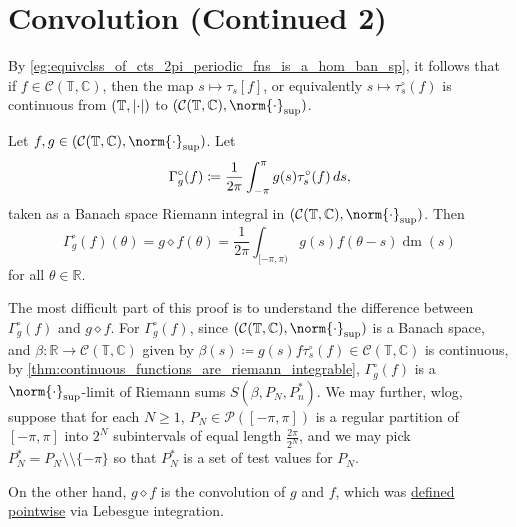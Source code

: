 \documentclass[notoc,notitlepage]{tufte-book}
\DeclareMathOperator{\dm}{dm}
\begin{document}
\section{Convolution (Continued 2)}%
\label{sec:convolution_continued_2}

By \cref{eg:equivclss_of_cts_2pi_periodic_fns_is_a_hom_ban_sp},
it follows that if $f \in \mathcal{C}(\mathbb{T}, \mathbb{C})$, then
the map $s \mapsto \tau_s[f]$, or equivalently $s \mapsto \tau_s^\circ(f)$
is continuous from $(\mathbb{T}, \left|\cdot\right|)$ to
$(\mathcal{C}(\mathbb{T}, \mathbb{C}), \norm{\cdot}_{\sup})$.

\begin{lemma}\label{lemma:pointwise_value_of_gamma_g}
  Let $f, g \in (\mathcal{C}(\mathbb{T}, \mathbb{C}), \norm{\cdot}_{\sup})$.
  Let
  \begin{equation*}
    \Gamma_g^\circ(f)
    \coloneqq \frac{1}{2\pi} \int_{-\pi}^{\pi} g(s)\tau_s^{\circ}(f) \mathop{}\!d{s},
  \end{equation*}
  taken as a Banach space Riemann integral
  in $(\mathcal{C}(\mathbb{T}, \mathbb{C}), \norm{\cdot}_{\sup})$.
  Then
  \begin{equation*}
    \Gamma_g^{\circ}(f)(\theta) = g \diamond f(\theta)
    = \frac{1}{2\pi} \int_{[-\pi, \pi)} g(s)f(\theta - s) \dm(s)
  \end{equation*}
  for all $\theta \in \mathbb{R}$.
\end{lemma}

\begin{strategy}
  The most difficult part of this proof is to understand the difference
  between $\Gamma_g^\circ(f)$ and $g \diamond f$.
  For $\Gamma_g^{\circ}(f)$,
  since $(\mathcal{C}(\mathbb{T}, \mathbb{C}), \norm{\cdot}_{\sup})$ is a Banach space,
  and $\beta : \mathbb{R} \to \mathcal{C}(\mathbb{T}, \mathbb{C})$ given by
  $\beta(s) \coloneqq g(s)f\tau_s^{\circ}(f) \in \mathcal{C}(\mathbb{T}, \mathbb{C})$
  is continuous, by \cref{thm:continuous_functions_are_riemann_integrable},
  $\Gamma_g^{\circ}(f)$ is a $\norm{\cdot}_{\sup}$-limit
  of Riemann sums $S(\beta, P_N, P_n^*)$.
  We may further, wlog, suppose that for each $N \geq 1$,
  $P_N \in \mathcal{P}([-\pi, \pi])$ is a regular partition of $[-\pi, \pi]$
  into $2^N$ subintervals of equal length $\frac{2\pi}{2^N}$,
  and we may pick $P_N^* = P_N \setminus \setminus \{ - \pi \}$
  so that $P_N^*$ is a set of test values for $P_N$.

  On the other hand, $g \diamond f$ is the convolution of $g$ and $f$,
  which was
  \hyperref[defn:convolution_on_romanl_1_mathbb_t_mathbb_c_]{defined pointwise}
  via Lebesgue integration.
\end{strategy}
\end{document}

